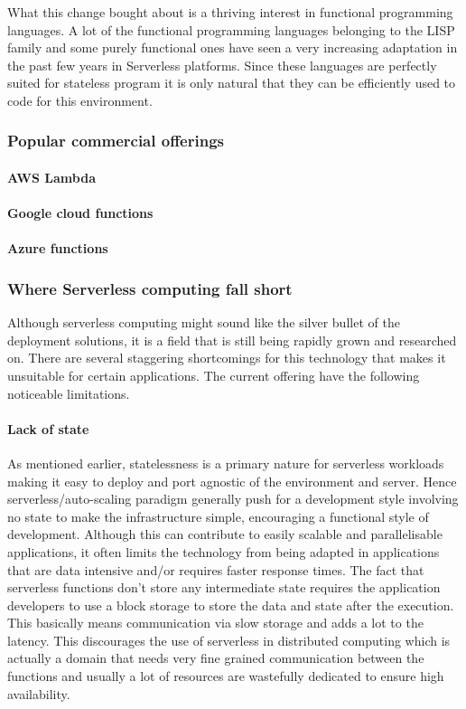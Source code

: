 \documentclass[12pt,titlepage]{article}
\begin{document}
What this change bought about is a thriving interest in functional programming
languages. A lot of the functional programming languages belonging to the LISP
family and some purely functional ones have seen a very increasing adaptation in
the past few years in Serverless platforms. Since these languages are perfectly
suited for stateless program it is only natural that they can be efficiently
used to code for this environment.
\subsubsection{Popular commercial offerings}
\label{sec:orgc9495bf}
\paragraph{AWS Lambda}
\label{sec:org895facb}
\paragraph{Google cloud functions}
\label{sec:orgad435ee}
\paragraph{Azure functions}
\label{sec:orgedd1f6d}
\subsubsection{Where Serverless computing fall short}
\label{sec:org2c01422}
Although serverless computing might sound like the silver bullet of the
deployment solutions, it is a field that is still being rapidly grown and
researched on. There are several staggering shortcomings for this technology
that makes it unsuitable for certain applications. The current offering have the
following noticeable limitations.
\paragraph{Lack of state}
\label{sec:org25739d3}
As mentioned earlier, statelessness is a primary nature for serverless workloads
making it easy to deploy and port agnostic of the environment and server.
Hence serverless/auto-scaling paradigm generally push for a development style
involving no state to make the infrastructure simple, encouraging a functional
style of development. Although this can contribute to easily scalable and
parallelisable applications, it often limits the technology from being adapted
in applications that are data intensive and/or requires faster response times.
The fact that serverless functions don't store any intermediate state requires
the application developers to use a block storage to store the data and state
after the execution. This basically means communication via slow storage and
adds a lot to the latency. This discourages the use of serverless in distributed
computing which is actually a domain that needs very fine grained communication
between the functions and usually a lot of resources are wastefully dedicated to
ensure high availability.
\end{document}
